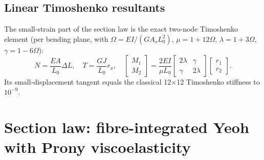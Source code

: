 \documentclass[11pt,a4paper]{article}
\begin{document}
\subsection{Linear Timoshenko resultants}
The small-strain part of the section law is the exact two-node Timoshenko element (per bending plane, with
$\Omega = EI/(G A_s L_0^2)$, $\mu = 1+12\Omega$, $\lambda=1+3\Omega$, $\gamma = 1-6\Omega$):
\begin{equation}
N = \frac{EA}{L_0}\Delta L,\quad T = \frac{GJ}{L_0}r_x,\quad
\begin{bmatrix}M_1\\M_2\end{bmatrix} = \frac{2EI}{\mu L_0}
\begin{bmatrix}2\lambda & \gamma\\ \gamma & 2\lambda\end{bmatrix}
\begin{bmatrix}r_1\\r_2\end{bmatrix} .
\label{eq:timo}
\end{equation}
Its small-displacement tangent equals the classical 12$\times$12 Timoshenko stiffness to $10^{-9}$.

\section{Section law: fibre-integrated Yeoh with Prony viscoelasticity}
\label{sec:section}
\end{document}
